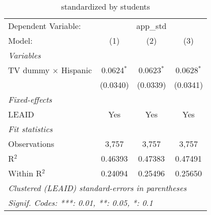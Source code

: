 \begin{table}[htbp]
\centering
\caption{ standardized by students}
\begin{tabular}{lccc}
\tabularnewline\midrule\midrule
Dependent Variable:&\multicolumn{3}{c}{app\_std}\\
Model:&(1) & (2) & (3)\\
\midrule \emph{Variables}&   &   &  \\
TV dummy $\times$ Hispanic & 0.0624$^{*}$ & 0.0623$^{*}$ & 0.0628$^{*}$\\
  &(0.0340) & (0.0339) & (0.0341)\\
\midrule \emph{Fixed-effects}&   &   &  \\
LEAID & Yes & Yes & Yes\\
\midrule \emph{Fit statistics}&  & & \\
Observations & 3,757&3,757&3,757\\
R$^2$ & 0.46393&0.47383&0.47491\\
Within R$^2$ & 0.24094&0.25496&0.25650\\
\midrule\midrule\multicolumn{4}{l}{\emph{Clustered (LEAID) standard-errors in parentheses}}\\
\multicolumn{4}{l}{\emph{Signif. Codes: ***: 0.01, **: 0.05, *: 0.1}}\\
\end{tabular}
\end{table}

